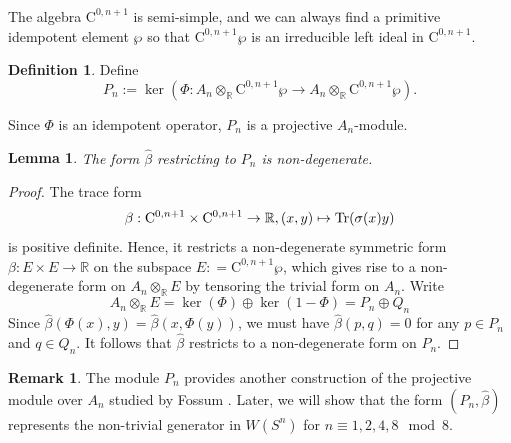 \documentclass[psamsfonts]{amsart}
\theoremstyle{plain}
\theoremstyle{theorem}
\newtheorem{lem}[theo]{Lemma}
\theoremstyle{definition}
\newtheorem{remark}[theo]{Remark}
\newtheorem{Def}[theo]{Definition}
\newcommand{\C}{\mathrm{C}}
\newcommand{\R}{\mathbb{R}}
\newcommand{\tr}{\textnormal{Tr}}
\newcommand{\W}{W}
\begin{document}
\subsubsection{ }
The algebra $\C^{0,n+1}$ is semi-simple, and we can always find a primitive idempotent element $\wp$ so that $\C^{0,n+1} \wp$ is an irreducible left ideal in $\C^{0,n+1}$.   

\begin{Def}\label{def:Pn}
Define \[P_n:= \ker(\Phi: A_n \otimes_{\mathbb{R}} \C^{0,n+1} \wp \to A_n \otimes_{\mathbb{R}} \C^{0,n+1} \wp ). \]
\end{Def}

Since $\Phi$ is an idempotent operator, $P_n$ is a projective $A_n$-module.  

\begin{lem}\label{lem:Pntheta}
The form $\hat\beta$ restricting to $P_n$ is non-degenerate. 
\end{lem}
\begin{proof}
The trace form 
\[ \beta: \C^{0,n+1} \times \C^{0,n+1} \to \mathbb{R}, (x,y) \mapsto  \tr(\sigma(x) y) \] 
is positive definite. Hence, it restricts a non-degenerate symmetric form  $ \beta: E \times E\to \mathbb{R}$ on the subspace $E: = \C^{0,n+1}\wp$, which gives rise to a non-degenerate form on $A_n\otimes_\R E$ by tensoring the trivial form on $A_n$. Write
\[A_n \otimes_\R E = \ker(\Phi) \oplus \ker(1 - \Phi) = P_n \oplus Q_n \]
Since $\hat{\beta}(\Phi(x) , y) =  \hat{\beta}(x , \Phi(y)) $, we must have $\hat{\beta}(p,q) = 0$ for any $p \in P_n$ and $q \in Q_n$. It follows that $\hat{\beta}$ restricts to a non-degenerate form on $P_n$. 
\end{proof}
\begin{remark}
The module $P_n$ provides another construction of the projective module over $A_n$ studied by Fossum \cite{Fossum69}. Later, we will show that the form $(P_n, \hat\beta)$ represents the non-trivial generator in $\W(S^n)$ for $n \equiv 1,2,4,8 \mod 8$. 
\end{remark}
\end{document}
